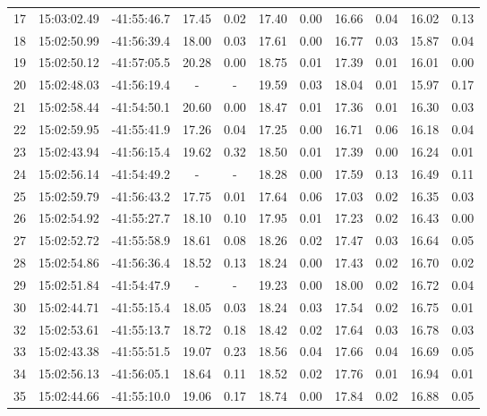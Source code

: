 \begin{longtable}{ccccccccccc}
\rowcolor[gray]{0.9}  17 & 15:03:02.49 & -41:55:46.7 & 17.45 & 0.02 & 17.40 & 0.00 & 16.66 & 0.04 & 16.02 & 0.13\\
\rowcolor[gray]{0.9}  18 & 15:02:50.99 & -41:56:39.4 & 18.00 & 0.03 & 17.61 & 0.00 & 16.77 & 0.03 & 15.87 & 0.04\\
\rowcolor[gray]{0.9}  19 & 15:02:50.12 & -41:57:05.5 & 20.28 & 0.00 & 18.75 & 0.01 & 17.39 & 0.01 & 16.01 & 0.00\\
 20 & 15:02:48.03 & -41:56:19.4 & - & - & 19.59 & 0.03 & 18.04 & 0.01 & 15.97 & 0.17\\
\rowcolor[gray]{0.9}  21 & 15:02:58.44 & -41:54:50.1 & 20.60 & 0.00 & 18.47 & 0.01 & 17.36 & 0.01 & 16.30 & 0.03\\
\rowcolor[gray]{0.9}  22 & 15:02:59.95 & -41:55:41.9 & 17.26 & 0.04 & 17.25 & 0.00 & 16.71 & 0.06 & 16.18 & 0.04\\
\rowcolor[gray]{0.9}  23 & 15:02:43.94 & -41:56:15.4 & 19.62 & 0.32 & 18.50 & 0.01 & 17.39 & 0.00 & 16.24 & 0.01\\
 24 & 15:02:56.14 & -41:54:49.2 & - & - & 18.28 & 0.00 & 17.59 & 0.13 & 16.49 & 0.11\\
\rowcolor[gray]{0.9}  25 & 15:02:59.79 & -41:56:43.2 & 17.75 & 0.01 & 17.64 & 0.06 & 17.03 & 0.02 & 16.35 & 0.03\\
\rowcolor[gray]{0.9}  26 & 15:02:54.92 & -41:55:27.7 & 18.10 & 0.10 & 17.95 & 0.01 & 17.23 & 0.02 & 16.43 & 0.00\\
\rowcolor[gray]{0.9}  27 & 15:02:52.72 & -41:55:58.9 & 18.61 & 0.08 & 18.26 & 0.02 & 17.47 & 0.03 & 16.64 & 0.05\\
\rowcolor[gray]{0.9}  28 & 15:02:54.86 & -41:56:36.4 & 18.52 & 0.13 & 18.24 & 0.00 & 17.43 & 0.02 & 16.70 & 0.02\\
 29 & 15:02:51.84 & -41:54:47.9 & - & - & 19.23 & 0.00 & 18.00 & 0.02 & 16.72 & 0.04\\
 30 & 15:02:44.71 & -41:55:15.4 & 18.05 & 0.03 & 18.24 & 0.03 & 17.54 & 0.02 & 16.75 & 0.01\\
 32 & 15:02:53.61 & -41:55:13.7 & 18.72 & 0.18 & 18.42 & 0.02 & 17.64 & 0.03 & 16.78 & 0.03\\
 33 & 15:02:43.38 & -41:55:51.5 & 19.07 & 0.23 & 18.56 & 0.04 & 17.66 & 0.04 & 16.69 & 0.05\\
 34 & 15:02:56.13 & -41:56:05.1 & 18.64 & 0.11 & 18.52 & 0.02 & 17.76 & 0.01 & 16.94 & 0.01\\
 35 & 15:02:44.66 & -41:55:10.0 & 19.06 & 0.17 & 18.74 & 0.00 & 17.84 & 0.02 & 16.88 & 0.05\\

\end{longtable}
